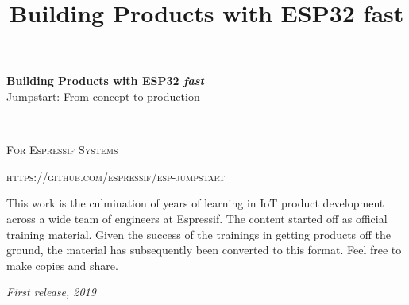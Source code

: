 \documentclass[11pt,fleqn]{book} %
\begin{document}
\title{Building Products with ESP32 fast}


\begingroup
\thispagestyle{empty}
\centering
\vspace*{6cm}
\par\normalfont\fontsize{35}{35}\sffamily\selectfont
\textbf{Building Products with ESP32 \textit{fast}}\\
{\LARGE Jumpstart: From concept to production}\par %
\vspace*{1cm}
{\Huge  }\par %

\endgroup


\newpage
~\vfill
\thispagestyle{empty}


\noindent \textsc{For Espressif Systems}

\noindent \textsc{https://github.com/espressif/esp-jumpstart} %

\noindent This work is the culmination of years of learning in  IoT product development across a wide team of engineers at Espressif. The content started off as official training material. Given the success of the trainings in getting products off the ground, the material has subsequently been converted to this format. Feel free to make copies and share. %

\noindent \textit{First release, 2019} %



\pagestyle{empty} %
\end{document}
